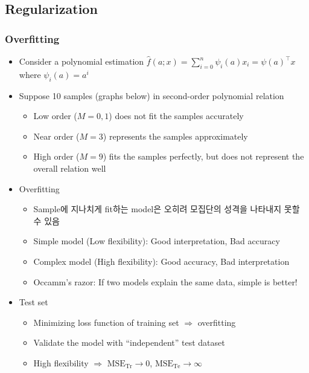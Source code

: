 \subsection{Regularization}

\subsubsection*{Overfitting}
\begin{itemize}
    \item Consider a polynomial estimation $\hat{f}(a;x)=\sum_{i=0}^n\psi_i(a)x_i=\psi(a)^{\top}x$ where $\psi_i(a)=a^i$
    \item Suppose 10 samples (graphs below) in second-order polynomial relation
    \begin{itemize}
        \item Low order ($M=0,1$) does not fit the samples accurately
        \item Near order ($M=3$) represents the samples approximately
        \item High order ($M=9$) fits the samples perfectly, but does not represent the overall relation well
    \end{itemize}
    \begin{figures}
    \end{figures}
    \item Overfitting
    \begin{itemize}
        \item Sample에 지나치게 fit하는 model은 오히려 모집단의 성격을 나타내지 못할 수 있음
        \item Simple model (Low flexibility): Good interpretation, Bad accuracy
        \item Complex model (High flexibility): Good accuracy, Bad interpretation
        \item Occamm's razor: If two models explain the same data, simple is better!
    \end{itemize}
    \begin{figures}
    \end{figures}
    \item Test set
    \begin{itemize}
        \item Minimizing loss function of training set $\Rightarrow$ overfitting
        \item Validate the model with ``independent'' test dataset
        \item High flexibility $\Rightarrow$ $\mathrm{MSE_{Tr}}\to 0$, $\mathrm{MSE_{Te}}\to\infty$
    \end{itemize}
\end{itemize}

